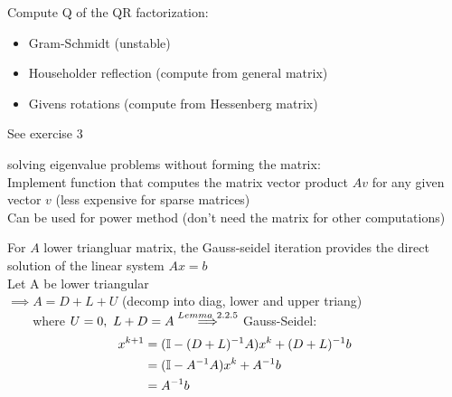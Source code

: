 \begin{SolutionSheet}[\ref{sheet9}]
\begin{onehalfspace}
  \begin{Solution} Compute Q of the QR factorization:
    \begin{itemize}
      \item Gram-Schmidt (unstable)
      \item Householder reflection (compute from general matrix)
      \item Givens rotations (compute from Hessenberg matrix)
    \end{itemize}
  \end{Solution}

  \begin{Solution}
    See exercise 3
  \end{Solution}

  \begin{Solution}
    solving eigenvalue problems without forming the matrix: \\
    Implement function that computes the matrix vector product $Av$ for any given vector $v$ (less expensive for sparse matrices) \\
    Can be used for power method (don't need the matrix for other computations)
  \end{Solution}

  \begin{Solution}
  \end{Solution}

  \begin{Solution}
    \Claim For $A$ lower triangluar matrix, the Gauss-seidel iteration provides 
    the direct solution of the linear system $Ax=b$\\
    \Proof Let A be lower triangular \\
    $\implies A=D+L+U$ (decomp into diag, lower and upper triang) \\
    $\phantom{\implies}$where $U = 0, \ L+D = A\\
    \\
    \stackrel{Lemma \ 2.2.5}{\implies}$ Gauss-Seidel:
    \begin{align*}
      x^{k+1} &= (\mathbb{I} - (D+L)^{-1} A) x^k + (D+L)^{-1} b \\
       &= (\mathbb{I} - A^{-1} A) x^k + A^{-1} b \\
       &= A^{-1}b
    \end{align*}
  \end{Solution}

\end{onehalfspace}
\end{SolutionSheet}


